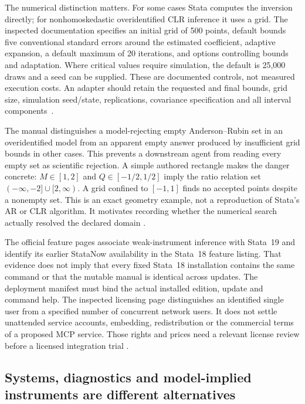 The numerical distinction matters. For some cases Stata computes the
inversion directly; for nonhomoskedastic overidentified CLR inference it
uses a grid. The inspected documentation specifies an initial grid of
500 points, default bounds five conventional standard errors around the
estimated coefficient, adaptive expansion, a default maximum of 20
iterations, and options controlling bounds and adaptation. Where critical
values require simulation, the default is 25,000 draws and a seed can be
supplied. These are documented controls, not measured execution costs.
An adapter should retain the requested and final bounds, grid size,
simulation seed/state, replications, covariance specification and all
interval components~\citep{exec13_ivrd_stata}.

The manual distinguishes a model-rejecting empty Anderson--Rubin set
in an overidentified model from an apparent empty answer produced by
insufficient grid bounds in other cases. This prevents a downstream
agent from reading every empty set as scientific rejection. A simple
authored rectangle makes the danger concrete: $M\in[1,2]$ and
$Q\in[-1/2,1/2]$ imply the ratio relation set
$(-\infty,-2]\cup[2,\infty)$. A grid confined to $[-1,1]$ finds no
accepted points despite a nonempty set. This is an exact geometry example,
not a reproduction of Stata's AR or CLR algorithm. It motivates recording
whether the numerical search actually resolved the declared domain
\citep{exec13_ivrd_exact}.

The official feature pages associate weak-instrument inference with Stata~19
and identify its earlier StataNow availability in the Stata~18 feature
listing. That evidence does not imply that every fixed Stata~18 installation
contains the same command or that the mutable manual is identical across
updates. The deployment manifest must bind the actual installed edition,
update and command help. The inspected licensing page distinguishes an
identified single user from a specified number of concurrent network users.
It does not settle unattended service accounts, embedding, redistribution
or the commercial terms of a proposed MCP service. Those rights and prices
need a relevant license review before a licensed integration trial
\citep{exec13_ivrd_stata,exec13_ivrd_license}.

\subsection{Systems, diagnostics and model-implied instruments are different alternatives}

